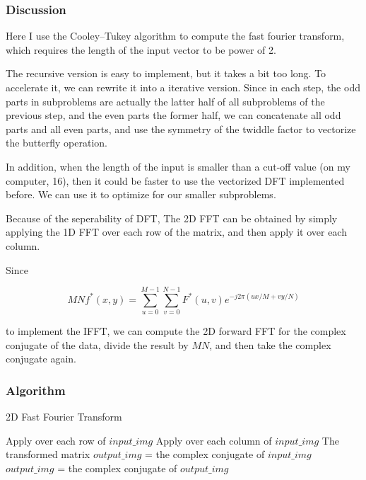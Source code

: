 \documentclass{article}
\begin{document}
\subsubsection{Discussion}

Here I use the Cooley–Tukey algorithm to compute the fast fourier transform, which requires the length of the input vector to be power of 2.

The recursive version is easy to implement, but it takes a bit too long. To accelerate it, we can rewrite it into a iterative version. Since in each step, the odd parts in subproblems are actually the latter half of all subproblems of the previous step, and the even parts the former half, we can concatenate all odd parts and all even parts, and use the symmetry of the twiddle factor to vectorize the butterfly operation.

In addition, when the length of the input is smaller than a cut-off value (on my computer, 16), then it could be faster to use the vectorized DFT implemented before. We can use it to optimize for our smaller subproblems.

Because of the seperability of DFT, The 2D FFT can be obtained by simply applying the 1D FFT over each row of the matrix, and then apply it over each column.

Since

$$MNf^*(x,y) = \sum_{u=0}^{M-1}\sum_{v=0}^{N-1} F^*(u, v) e^{-j2\pi (ux/M + vy/N)}$$

to implement the IFFT, we can compute the 2D forward FFT for the complex conjugate of the data, divide the result by $MN$, and then take the complex conjugate again.

\subsubsection{Algorithm}

\begin{algorithm}[H]
\centering
\caption{2D Fast Fourier Transform}
  \begin{algorithmic}[1]
         \State Apply  over each row of $input\_img$
         \State Apply  over each column of $input\_img$
         \State \Return The transformed matrix
      \Else
         \State $output\_img$ = the complex conjugate of $input\_img$
         \State $output\_img$ = 
         \State \Return the complex conjugate of $output\_img$
      \EndIf
    \EndFunction
  \end{algorithmic}
\end{algorithm}
\end{document}
